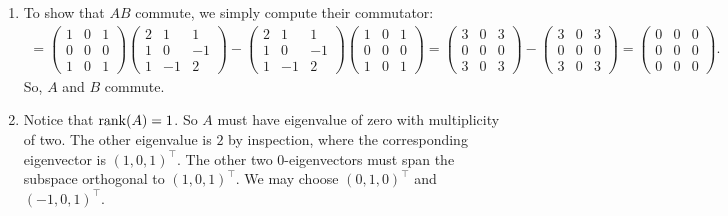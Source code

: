 \documentclass{article}
\theoremstyle{definition}
\begin{document}
\begin{enumerate}[label=(\alph*)]
	\item To show that $AB$ commute, we simply compute their commutator:
	\begin{align*}
	[A,B] = \begin{pmatrix}
	1 & 0 & 1\\
	0 & 0 & 0\\
	1 & 0 & 1
	\end{pmatrix} 
	\begin{pmatrix}
	2 & 1 & 1 \\
	1 & 0 & -1\\
	1 & -1 & 2
	\end{pmatrix}
	- 
	\begin{pmatrix}
	2 & 1 & 1 \\
	1 & 0 & -1\\
	1 & -1 & 2
	\end{pmatrix}
	\begin{pmatrix}
	1 & 0 & 1\\
	0 & 0 & 0\\
	1 & 0 & 1
	\end{pmatrix} 
	= 
	\begin{pmatrix}
	3 & 0 & 3\\
	0 & 0 & 0\\
	3 & 0 & 3
	\end{pmatrix}
	-
	\begin{pmatrix}
	3 & 0 & 3\\
	0 & 0 & 0\\
	3 & 0 & 3
	\end{pmatrix} = 
	\begin{pmatrix}
	0 & 0 & 0\\
	0 & 0 & 0\\
	0 & 0 & 0
	\end{pmatrix}.   
	\end{align*}
	So, $A$ and $B$ commute.
	
	
	\item Notice that $\rank(A) = 1$. So $A$ must have eigenvalue of zero with multiplicity of two. The other eigenvalue is $2$ by inspection, where the corresponding eigenvector is $(1,0,1)^\top$. The other two $0$-eigenvectors must span the subspace orthogonal to $(1,0,1)^\top$. We may choose $(0,1,0)^\top$ and $(-1,0,1)^\top$.\\
	

\end{enumerate}
\end{document}
